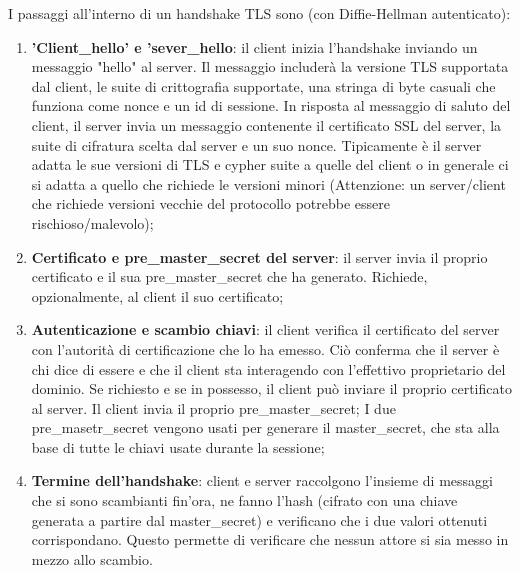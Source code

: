 I passaggi all'interno di un handshake TLS sono (con  Diffie-Hellman autenticato):
\begin{enumerate}
    \item \textbf{'Client\_hello' e 'sever\_hello}: il client inizia l'handshake inviando un messaggio "hello" al server. Il messaggio includerà la versione TLS supportata dal client, le suite di crittografia supportate, una stringa di byte casuali che funziona come nonce e un id di sessione.
	In risposta al messaggio di saluto del client, il server invia un messaggio contenente il certificato SSL del server, la suite di cifratura scelta dal server e un suo nonce. Tipicamente è il server adatta le sue versioni di TLS e cypher suite a quelle del client o in generale ci si adatta a quello che richiede le versioni minori (Attenzione: un server/client che richiede versioni vecchie del protocollo potrebbe essere rischioso/malevolo);
	\item \textbf{Certificato e pre\_master\_secret del server}: il server invia il proprio certificato e il sua pre\_master\_secret che ha generato. Richiede, opzionalmente, al client il suo certificato;
	\item \textbf{Autenticazione e scambio chiavi}: il client verifica il certificato del server con l'autorità di certificazione che lo ha emesso. Ciò conferma che il server è chi dice di essere e che il client sta interagendo con l'effettivo proprietario del dominio. Se richiesto e se in possesso, il client può inviare il proprio certificato al server. Il client invia il proprio pre\_master\_secret;
	I due pre\_masetr\_secret vengono usati per generare il master\_secret, che sta alla base di tutte le chiavi usate durante la sessione;
	\item \textbf{Termine dell'handshake}: client e server raccolgono l'insieme di messaggi che si sono scambianti fin'ora, ne fanno l'hash (cifrato con una chiave generata a partire dal master\_secret) e verificano che i due valori ottenuti corrispondano. Questo permette di verificare che nessun attore si sia messo in mezzo allo scambio.
\end{enumerate}

